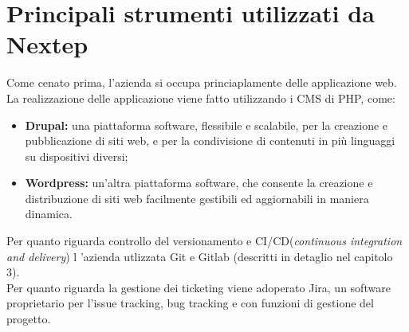 \section{Principali strumenti utilizzati da Nextep}
Come cenato prima, l'azienda si occupa princiaplamente delle applicazione web. La realizzazione delle applicazione viene fatto utilizzando i CMS di PHP, come:
\begin{itemize}

	\item \textbf{Drupal:} una piattaforma software, flessibile e scalabile, per la creazione e pubblicazione
	di siti web, e per la condivisione di contenuti in più linguaggi su
	dispositivi diversi;
		\item \textbf{Wordpress:} un'altra piattaforma software, che consente la creazione e
	distribuzione di siti web facilmente gestibili ed aggiornabili in maniera dinamica.
\end{itemize}

Per quanto riguarda controllo del versionamento e CI/CD(\emph{continuous integration and delivery}) l 'azienda utlizzata Git e Gitlab (descritti in detaglio nel capitolo 3).
\\

Per quanto riguarda la gestione dei ticketing viene adoperato Jira, un software proprietario per l’issue tracking, bug tracking
e con funzioni di gestione del progetto.

